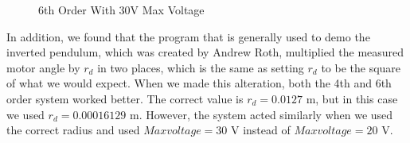 \documentclass{article}
\begin{document}
\begin{figure}
\centering
{}
\caption{6th Order With 30V Max Voltage}
\end{figure}

In addition, we found that the program that is generally used to demo the inverted pendulum, which was created by Andrew Roth, multiplied the measured motor angle by $r_d$ in two places, which is the same as setting $r_d$ to be the square of what we would expect. When we made this alteration, both the 4th and 6th order system worked better. The correct value is $r_d = 0.0127$ m, but in this case we used $r_d = 0.00016129$ m. However, the system acted similarly when we used the correct radius and used $Maxvoltage = 30$ V instead of $Maxvoltage = 20$ V.
\end{document}

